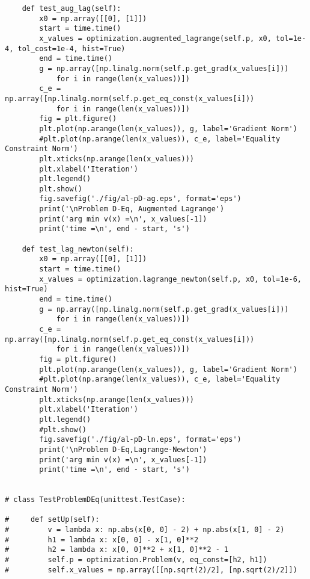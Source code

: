 \begin{lstlisting}
    def test_aug_lag(self):
        x0 = np.array([[0], [1]])
        start = time.time()
        x_values = optimization.augmented_lagrange(self.p, x0, tol=1e-4, tol_cost=1e-4, hist=True)
        end = time.time()
        g = np.array([np.linalg.norm(self.p.get_grad(x_values[i]))
            for i in range(len(x_values))])
        c_e = np.array([np.linalg.norm(self.p.get_eq_const(x_values[i]))
            for i in range(len(x_values))])
        fig = plt.figure()
        plt.plot(np.arange(len(x_values)), g, label='Gradient Norm')
        #plt.plot(np.arange(len(x_values)), c_e, label='Equality Constraint Norm')
        plt.xticks(np.arange(len(x_values)))
        plt.xlabel('Iteration')
        plt.legend()
        plt.show()
        fig.savefig('./fig/al-pD-ag.eps', format='eps')
        print('\nProblem D-Eq, Augmented Lagrange')
        print('arg min v(x) =\n', x_values[-1])
        print('time =\n', end - start, 's')
    
    def test_lag_newton(self):
        x0 = np.array([[0], [1]])
        start = time.time()
        x_values = optimization.lagrange_newton(self.p, x0, tol=1e-6, hist=True)
        end = time.time()
        g = np.array([np.linalg.norm(self.p.get_grad(x_values[i]))
            for i in range(len(x_values))])
        c_e = np.array([np.linalg.norm(self.p.get_eq_const(x_values[i]))
            for i in range(len(x_values))])
        fig = plt.figure()
        plt.plot(np.arange(len(x_values)), g, label='Gradient Norm')
        #plt.plot(np.arange(len(x_values)), c_e, label='Equality Constraint Norm')
        plt.xticks(np.arange(len(x_values)))
        plt.xlabel('Iteration')
        plt.legend()
        #plt.show()
        fig.savefig('./fig/al-pD-ln.eps', format='eps')
        print('\nProblem D-Eq,Lagrange-Newton')
        print('arg min v(x) =\n', x_values[-1])
        print('time =\n', end - start, 's')


# class TestProblemDEq(unittest.TestCase):

#     def setUp(self):
#         v = lambda x: np.abs(x[0, 0] - 2) + np.abs(x[1, 0] - 2)
#         h1 = lambda x: x[0, 0] - x[1, 0]**2
#         h2 = lambda x: x[0, 0]**2 + x[1, 0]**2 - 1
#         self.p = optimization.Problem(v, eq_const=[h2, h1])
#         self.x_values = np.array([[np.sqrt(2)/2], [np.sqrt(2)/2]])


\end{lstlisting}
